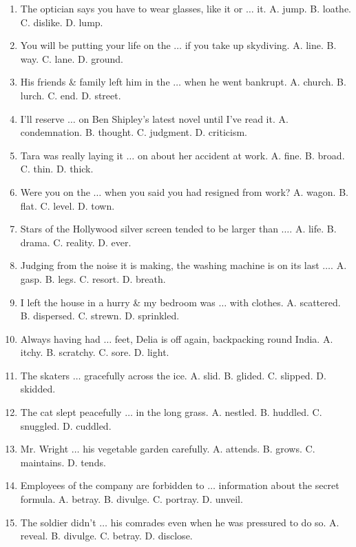\documentclass{article}
\numberwithin{equation}{section}
\begin{document}
\begin{enumerate}[leftmargin=8mm]
	\item The optician says you have to wear glasses, like it or $\ldots$ it. {\sf A.} jump. {\sf B.} loathe. {\sf C.} dislike. {\sf D.} lump.
	\item You will be putting your life on the $\ldots$ if you take up skydiving. {\sf A.} line. {\sf B.} way. {\sf C.} lane. {\sf D.} ground.
	\item His friends \& family left him in the $\ldots$ when he went bankrupt. {\sf A.} church. {\sf B.} lurch. {\sf C.} end. {\sf D.} street.
	\item I'll reserve $\ldots$ on Ben Shipley's latest novel until I've read it. {\sf A.} condemnation. {\sf B.} thought. {\sf C.} judgment. {\sf D.} criticism.
	\item Tara was really laying it $\ldots$ on about her accident at work. {\sf A.} fine. {\sf B.} broad. {\sf C.} thin. {\sf D.} thick.
	\item Were you on the $\ldots$ when you said you had resigned from work? {\sf A.} wagon. {\sf B.} flat. {\sf C.} level. {\sf D.} town.
	\item Stars of the Hollywood silver screen tended to be larger than $\ldots$. {\sf A.} life. {\sf B.} drama. {\sf C.} reality. {\sf D.} ever.
	\item Judging from the noise it is making, the washing machine is on its last $\ldots$. {\sf A.} gasp. {\sf B.} legs. {\sf C.} resort. {\sf D.} breath.
	\item I left the house in a hurry \& my bedroom was $\ldots$ with clothes. {\sf A.} scattered. {\sf B.} dispersed. {\sf C.} strewn. {\sf D.} sprinkled.
	\item Always having had $\ldots$ feet, Delia is off again, backpacking round India. {\sf A.} itchy. {\sf B.} scratchy. {\sf C.} sore. {\sf D.} light.
	\item The skaters $\ldots$ gracefully across the ice. {\sf A.} slid. {\sf B.} glided. {\sf C.} slipped. {\sf D.} skidded.
	\item The cat slept peacefully $\ldots$ in the long grass. {\sf A.} nestled. {\sf B.} huddled. {\sf C.} snuggled. {\sf D.} cuddled.
	\item Mr. Wright $\ldots$ his vegetable garden carefully. {\sf A.} attends. {\sf B.} grows. {\sf C.} maintains. {\sf D.} tends.
	\item Employees of the company are forbidden to $\ldots$ information about the secret formula. {\sf A.} betray. {\sf B.} divulge. {\sf C.} portray. {\sf D.} unveil.
	\item The soldier didn't $\ldots$ his comrades even when he was pressured to do so. {\sf A.} reveal. {\sf B.} divulge. {\sf C.} betray. {\sf D.} disclose.

\end{enumerate}
\end{document}
